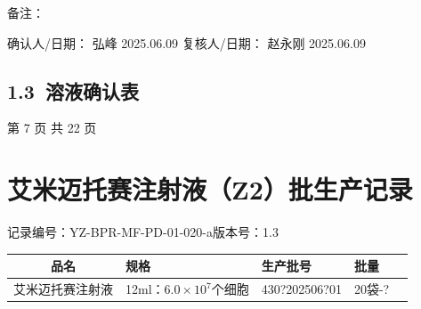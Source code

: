 \documentclass[UTF8,10pt,a4paper,fontset=fandol]{ctexart}
\newcommand{\fieldvalue}[1]{#1}
\newcommand{\handwritten}[1]{#1}
\begin{document}
\noindent
备注：

\medskip

\noindent
确认人/日期：
\fieldvalue{\handwritten{弘峰}}
\quad
\fieldvalue{\handwritten{2025.06.09}}
\qquad
复核人/日期：
\fieldvalue{\handwritten{赵永刚}}
\quad
\fieldvalue{\handwritten{2025.06.09}}

\subsection*{1.3\ 溶液确认表}

\noindent

\begin{center}
第 7 页 共 22 页
\end{center}

\newpage

\section{艾米迈托赛注射液（Z2）批生产记录}

\noindent
记录编号：YZ-BPR-MF-PD-01-020-a\hfill 版本号：1.3

\begin{tabularx}{\textwidth}{|c|X|X|X|X|}
\hline
品名 & 规格 & 生产批号 & 批量 \\
\hline
艾米迈托赛注射液 & 12ml：$6.0\times10^{7}$个细胞 &
\fieldvalue{\handwritten{430?202506?01}} &
\fieldvalue{\handwritten{20袋-?}} \\
\hline
\end{tabularx}
\end{document}
